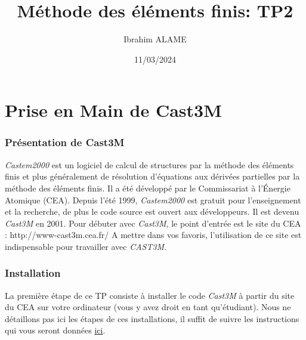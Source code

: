 \documentclass[a4paper,multicol]{article}
\title{Méthode des éléments finis: TP2}
\author{Ibrahim ALAME}
\date{11/03/2024}
\begin{document}
\maketitle
\section*{Prise en Main de Cast3M}
\subsubsection*{Présentation de Cast3M}
{\em Castem2000} est un logiciel de calcul de structures par la méthode des éléments
finis et plus généralement de résolution d'équations aux dérivées partielles par la méthode des éléments finis.
Il a été développé par le Commissariat à l'Énergie Atomique (CEA).
Depuis l'été 1999, {\em Castem2000} est gratuit pour l'enseignement et la recherche, de plus le code source est ouvert aux développeurs. Il est devenu {\em Cast3M} en 2001. 
Pour débuter avec {\em Cast3M}, le point d'entrée est le site du CEA : http://www-cast3m.cea.fr/
A mettre dans vos favoris, l'utilisation de ce site est indispensable pour travailler avec {\em CAST3M}.

\subsubsection*{Installation}
La première étape de ce TP consiste à installer le code {\em Cast3M} à partir du site du CEA sur votre ordinateur (vous y avez droit en tant qu'étudiant). Nous ne détaillons pas ici les étapes de ces installations, il suffit de suivre les instructions qui vous seront données \href{http://www-cast3m.cea.fr/index.php?xml=download1}{ici}.
\end{document}
